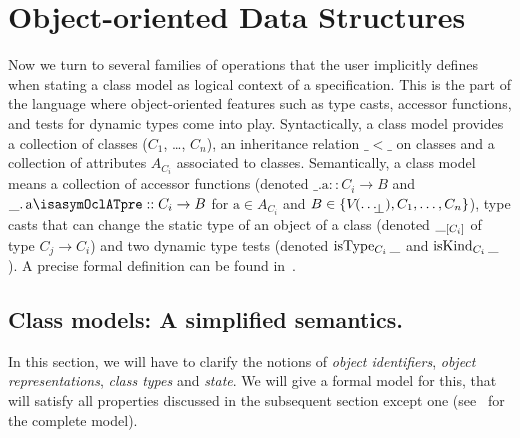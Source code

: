 \section{Object-oriented Data Structures}%
Now we turn to several families of operations that the user implicitly defines
when stating a class model as logical context of a specification. This is the
part of the language where object-oriented features such as type casts, accessor
functions, and tests for dynamic types come into play. Syntactically, a class
model provides a collection of classes ($C_1$, \ldots, $C_n$),
an inheritance relation $\_ < \_$ on
classes and a collection of attributes $A_{C_i}$ associated to classes.  Semantically,
a class model means a collection of accessor functions (denoted $\_\text{.a}::C_i
\rightarrow B$ and $\getAttrib{\_}{a\isasymOclATpre}::C_i \rightarrow B$ for
$\text{a}\in A_{C_i}$ and $B\in \{\V{}{\up{\ldots}}, C_1, \ldots, C_n\}$),
type casts that can change the static type of an object of a class
(denoted $\typeCast{\_}{\text{$C_i$}}$ of type $C_j \rightarrow C_i$) and
two dynamic type tests
(denoted $\isType{\text{$C_i$}}{\_}$ and $\isKind{\text{$C_i$}}{\_}$ ).
A precise formal definition can be found in~\cite{brucker.ea:semantics:2009}.

\subsection{Class models: A simplified semantics.}
In this section, we will have to clarify the notions of \emph{object
  identifiers}, \emph{object representations}, \emph{class types} and
\emph{state}. We will give a formal model for this, that will satisfy all
properties discussed in the subsequent section except one
(see~\cite{brucker.ea:extensible:2008-b} for the complete model).

